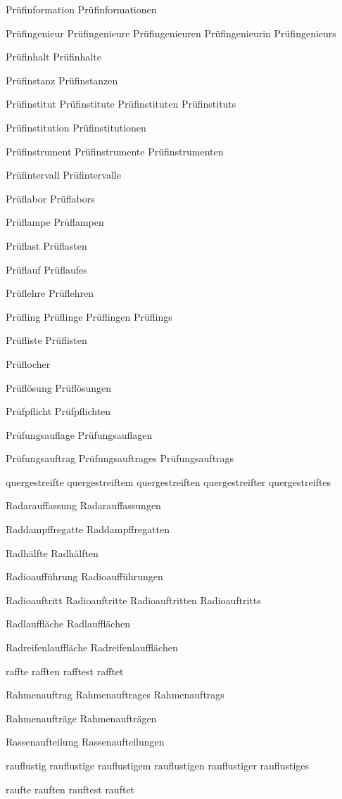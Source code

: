 Prüfinformation
Prüfinformationen

Prüfingenieur
Prüfingenieure
Prüfingenieuren
Prüfingenieurin
Prüfingenieurs

Prüfinhalt
Prüfinhalte

Prüfinstanz
Prüfinstanzen

Prüfinstitut
Prüfinstitute
Prüfinstituten
Prüfinstituts

Prüfinstitution
Prüfinstitutionen

Prüfinstrument
Prüfinstrumente
Prüfinstrumenten

Prüfintervall
Prüfintervalle

Prüflabor
Prüflabors

Prüflampe
Prüflampen

Prüflast
Prüflasten

Prüflauf
Prüflaufes

Prüflehre
Prüflehren

Prüfling
Prüflinge
Prüflingen
Prüflings

Prüfliste
Prüflisten

Prüflocher

Prüflösung
Prüflösungen

Prüfpflicht
Prüfpflichten

Prüfungsauflage
Prüfungsauflagen

Prüfungsauftrag
Prüfungsauftrages
Prüfungsauftrags

quergestreifte
quergestreiftem
quergestreiften
quergestreifter
quergestreiftes

Radarauffassung
Radarauffassungen

Raddampffregatte
Raddampffregatten

Radhälfte
Radhälften

Radioaufführung
Radioaufführungen

Radioauftritt
Radioauftritte
Radioauftritten
Radioauftritts

Radlauffläche
Radlaufflächen

Radreifenlauffläche
Radreifenlaufflächen

raffte
rafften
rafftest
rafftet

Rahmenauftrag
Rahmenauftrages
Rahmenauftrags

Rahmenaufträge
Rahmenaufträgen

Rassenaufteilung
Rassenaufteilungen

rauflustig
rauflustige
rauflustigem
rauflustigen
rauflustiger
rauflustiges

raufte
rauften
rauftest
rauftet

